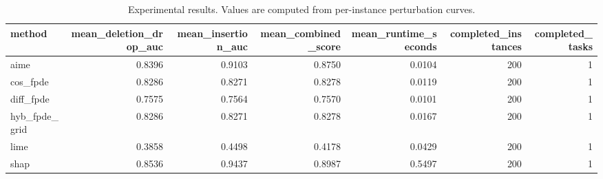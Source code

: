 \begin{table}[t]
\caption{Experimental results. Values are computed from per-instance perturbation curves.}
\label{tab:main_results_computed}
\centering
\begin{tabular}{lrrrrrr}
\toprule
method & mean\_deletion\_drop\_auc & mean\_insertion\_auc & mean\_combined\_score & mean\_runtime\_seconds & completed\_instances & completed\_tasks \\
\midrule
aime & 0.8396 & 0.9103 & 0.8750 & 0.0104 & 200 & 1 \\
cos\_fpde & 0.8286 & 0.8271 & 0.8278 & 0.0119 & 200 & 1 \\
diff\_fpde & 0.7575 & 0.7564 & 0.7570 & 0.0101 & 200 & 1 \\
hyb\_fpde\_grid & 0.8286 & 0.8271 & 0.8278 & 0.0167 & 200 & 1 \\
lime & 0.3858 & 0.4498 & 0.4178 & 0.0429 & 200 & 1 \\
shap & 0.8536 & 0.9437 & 0.8987 & 0.5497 & 200 & 1 \\
\bottomrule
\end{tabular}

\end{table}
